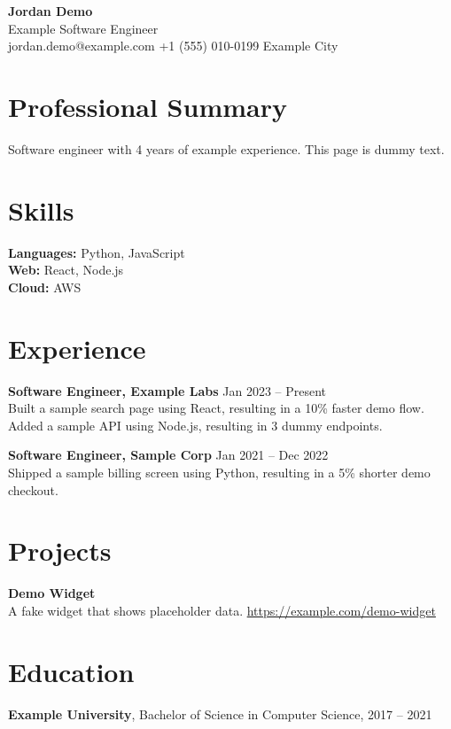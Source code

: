 \documentclass[letterpaper,10pt]{article}
\begin{document}
\begin{center}
\textbf{\Huge Jordan Demo} \\
Example Software Engineer \\
jordan.demo@example.com \quad +1 (555) 010-0199 \quad Example City
\end{center}

\section{Professional Summary}
Software engineer with 4 years of example experience. This page is dummy text.

\section{Skills}
\textbf{Languages:} Python, JavaScript \\
\textbf{Web:} React, Node.js \\
\textbf{Cloud:} AWS

\section{Experience}
\textbf{Software Engineer, Example Labs} \hfill Jan 2023 -- Present \\
Built a sample search page using React, resulting in a 10\% faster demo flow. \\
Added a sample API using Node.js, resulting in 3 dummy endpoints.

\textbf{Software Engineer, Sample Corp} \hfill Jan 2021 -- Dec 2022 \\
Shipped a sample billing screen using Python, resulting in a 5\% shorter demo checkout.

\section{Projects}
\textbf{Demo Widget} \\
A fake widget that shows placeholder data. \url{https://example.com/demo-widget}

\section{Education}
\textbf{Example University}, Bachelor of Science in Computer Science, 2017 -- 2021
\end{document}
